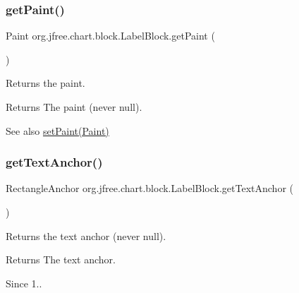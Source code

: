 \subsubsection{\texorpdfstring{get\+Paint()}{getPaint()}}
{\footnotesize\ttfamily Paint org.\+jfree.\+chart.\+block.\+Label\+Block.\+get\+Paint (\begin{DoxyParamCaption}{ }\end{DoxyParamCaption})}

Returns the paint.

\begin{DoxyReturn}{Returns}
The paint (never {\ttfamily null}).
\end{DoxyReturn}
\begin{DoxySeeAlso}{See also}
\mbox{\hyperlink{classorg_1_1jfree_1_1chart_1_1block_1_1_label_block_a88d7274f6d74fae447e65378468ee28c}{set\+Paint(\+Paint)}} 
\end{DoxySeeAlso}
\mbox{\label{classorg_1_1jfree_1_1chart_1_1block_1_1_label_block_a426432351700ca6d4dddfa1da2b3f9f4}} 
\subsubsection{\texorpdfstring{get\+Text\+Anchor()}{getTextAnchor()}}
{\footnotesize\ttfamily Rectangle\+Anchor org.\+jfree.\+chart.\+block.\+Label\+Block.\+get\+Text\+Anchor (\begin{DoxyParamCaption}{ }\end{DoxyParamCaption})}

Returns the text anchor (never {\ttfamily null}).

\begin{DoxyReturn}{Returns}
The text anchor.
\end{DoxyReturn}
\begin{DoxySince}{Since}
1.. 
\end{DoxySince}
\mbox{\label{classorg_1_1jfree_1_1chart_1_1block_1_1_label_block_a4a3b1ea9db36840c94af45dbe48a8859}} 

